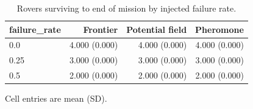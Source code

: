 \begin{table}[t]
\centering
\caption{Rovers surviving to end of mission by injected failure rate.}
\label{tab:by-failure}
\begin{tabular}{lrrr}
\toprule
failure\_rate & Frontier & Potential field & Pheromone \\
\midrule
0.0 & 4.000 (0.000) & 4.000 (0.000) & 4.000 (0.000) \\
0.25 & 3.000 (0.000) & 3.000 (0.000) & 3.000 (0.000) \\
0.5 & 2.000 (0.000) & 2.000 (0.000) & 2.000 (0.000) \\
\bottomrule
\end{tabular}
\par\vspace{2pt}\footnotesize Cell entries are mean (SD).
\end{table}
